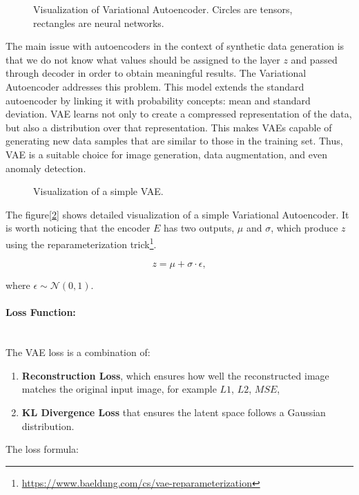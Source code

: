 \begin{figure}[H]
    \centering
    
    \caption{Visualization of Variational Autoencoder. Circles are tensors, rectangles are neural networks.}
    \label{fig:vae}
\end{figure}

\indent The main issue with autoencoders in the context of synthetic data generation is that we do not know what values should be assigned to the layer $z$ and passed through decoder in order to obtain meaningful results. The Variational Autoencoder addresses this problem.
This model extends the standard autoencoder by linking it with probability concepts: mean and standard deviation. VAE learns not only to create a compressed representation of the data, but also a distribution over that representation. This makes VAEs capable of generating new data samples that are similar to those in the training set. Thus, VAE is a suitable choice for image generation, data augmentation, and even anomaly detection.

\begin{figure}[H]
    \centering
    
    \caption{Visualization of a simple VAE.}
    \label{fig:vae-simple}
\end{figure}

The figure[\ref{fig:vae-simple}] shows detailed visualization of a simple Variational Autoencoder. It is worth noticing that the encoder $E$ has two outputs, $\mu$ and $\sigma$, which produce $z$ using the reparameterization trick\footnote{\url{https://www.baeldung.com/cs/vae-reparameterization}}.

\begin{equation}
    z = \mu + \sigma\cdot\epsilon,
\end{equation}

where $\epsilon\sim\mathcal{N}(0,1)$.

\paragraph{Loss Function:}\mbox{}\\
The VAE loss is a combination of:
\begin{enumerate}
\item \textbf{Reconstruction Loss}, which ensures how well the reconstructed image matches the original input image, for example $L1$, $L2$, $MSE$,
\item \textbf{KL Divergence Loss} that ensures the latent space follows a Gaussian distribution.
\end{enumerate}
The loss formula:

